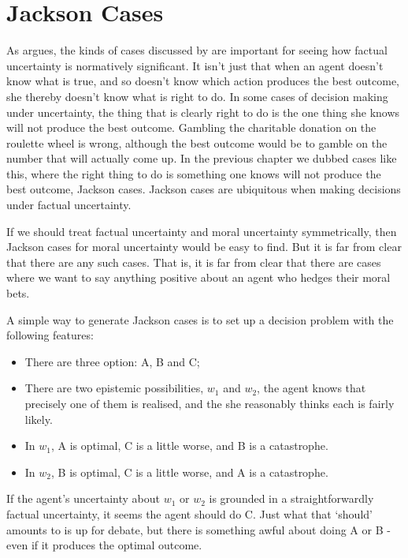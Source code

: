 \section{Jackson Cases}
\label{jacksoncases}

As \citet{Zimmerman2008} argues, the kinds of cases discussed by \citet{Jackson1991} are important for seeing how factual uncertainty is normatively significant. It isn't just that when an agent doesn't know what is true, and so doesn't know which action produces the best outcome, she thereby doesn't know what is right to do. In some cases of decision making under uncertainty, the thing that is clearly right to do is the one thing she knows will not produce the best outcome. Gambling the charitable donation on the roulette wheel is wrong, although the best outcome would be to gamble on the number that will actually come up. In the previous chapter we dubbed cases like this, where the right thing to do is something one knows will not produce the best outcome, Jackson cases. Jackson cases are ubiquitous when making decisions under factual uncertainty.

If we should treat factual uncertainty and moral uncertainty symmetrically, then Jackson cases for moral uncertainty would be easy to find. But it is far from clear that there are any such cases. That is, it is far from clear that there are cases where we want to say anything positive about an agent who hedges their moral bets.

A simple way to generate Jackson cases is to set up a decision problem with the following features:

\begin{itemize}
\item{} There are three option: A, B and C;

\item{} There are two epistemic possibilities, $w_1$ and $w_2$, the agent knows that precisely one of them is realised, and the she reasonably thinks each is fairly likely.

\item{} In $w_1$, A is optimal, C is a little worse, and B is a catastrophe.

\item{} In $w_2$, B is optimal, C is a little worse, and A is a catastrophe.

\end{itemize}
If the agent's uncertainty about $w_1$ or $w_2$ is grounded in a straightforwardly factual uncertainty, it seems the agent should do C. Just what that `should' amounts to is up for debate, but there is something awful about doing A or B - even if it produces the optimal outcome.

